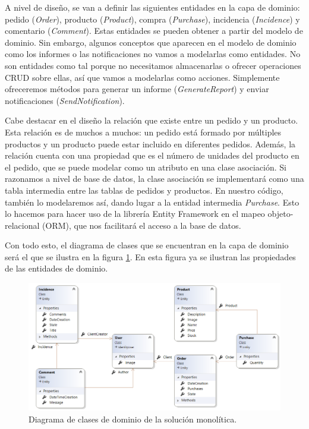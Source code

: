 \documentclass[11pt,spanish,listoffigures]{tfgetsinf}
\begin{document}
A nivel de diseño, se van a definir las siguientes entidades en la capa de dominio: pedido (\textit{Order}), producto (\textit{Product}), compra (\textit{Purchase}), incidencia (\textit{Incidence}) y comentario (\textit{Comment}). Estas entidades se pueden obtener a partir del modelo de dominio. Sin embargo, algunos conceptos que aparecen en el modelo de dominio como los informes o las notificaciones no vamos a modelarlas como entidades. No son entidades como tal porque no necesitamos almacenarlas o ofrecer operaciones CRUD sobre ellas, así que vamos a modelarlas como acciones. Simplemente ofreceremos métodos para generar un informe (\textit{GenerateReport}) y enviar notificaciones (\textit{SendNotification}).

Cabe destacar en el diseño la relación que existe entre un pedido y un producto. Esta relación es de muchos a muchos: un pedido está formado por múltiples productos y un producto puede estar incluido en diferentes pedidos. Además, la relación cuenta con una propiedad que es el número de unidades del producto en el pedido, que se puede modelar como un atributo en una clase asociación. Si razonamos a nivel de base de datos, la clase asociación se implementará como una tabla intermedia entre las tablas de pedidos y productos. En nuestro código, también lo modelaremos así, dando lugar a la entidad intermedia \textit{Purchase}. Esto lo hacemos para hacer uso de la librería Entity Framework en el mapeo objeto-relacional (ORM), que nos facilitará el acceso a la base de datos.

Con todo esto, el diagrama de clases que se encuentran en la capa de dominio será el que se ilustra en la figura \ref{fig:ClassDiagram}. En esta figura ya se ilustran las propiedades de las entidades de dominio.

\begin{figure}[h]
\centering
\includegraphics[scale=0.65]{ClassDiagram}
\caption{Diagrama de clases de dominio de la solución monolítica.}
\label{fig:ClassDiagram}
\end{figure}
\end{document}
